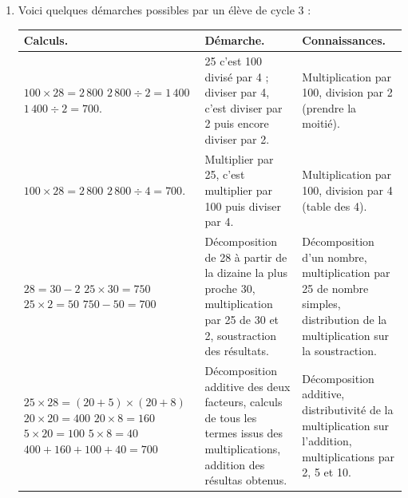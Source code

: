 \begin{corrige}
\begin{enumerate}
\begin{itemize}
   \end{itemize}
   \item Voici quelques démarches possibles par un élève de cycle 3 : \\ [3mm]
\begin{tabular}{|p{4.8cm}|p{5.2cm}|p{4.6cm}|}
      \hline
      Calculs. & Démarche. & Connaissances. \\
      \hline
      $100\times28 =2\,800$ \newline
      $2\,800\div2 =1\,400$ \newline
      $1\,400\div2 =700$.
      &
      25 c'est 100 divisé par 4 ; diviser par 4, c'est diviser par 2 puis encore diviser par 2. 
      &
      Multiplication par 100, division par 2 (prendre la moitié). \\
      \hline
      $100\times28 =2\,800$ \newline
      $2\,800\div4 =700$.
      &
      Multiplier par 25, c'est multiplier par 100 puis diviser par 4.
      &
      Multiplication par 100, \newline
      division par 4 (table des 4). \\
      \hline
      $28 =30-2$ \newline
      $25\times30 =750$ \newline
      $25\times2 =50$ \newline
      $750-50 =700$
      &
      Décomposition de 28 à partir de la dizaine la plus proche 30,  multiplication par 25 de 30 et 2, soustraction des résultats.
      &
      Décomposition d'un nombre, multiplication par 25 de nombre simples, distribution de la multiplication sur la soustraction. \\
      \hline
      $25\times28 =(20+5)\times(20+8)$ \newline
      $20\times20 =400$ \newline
      $20\times8 =160$ \newline
      $5\times20 =100$ \newline
      $5\times8 =40$ \newline
      $400+160+100+40 =700$
      &
      Décomposition additive des deux facteurs, calculs de tous les termes issus des multiplications, addition des résultas obtenus.
      &
      Décomposition additive, distributivité de la multiplication sur l'addition, multiplications par 2, 5 et 10. \\
      \hline
   \end{tabular}
\end{enumerate}
\end{corrige}

